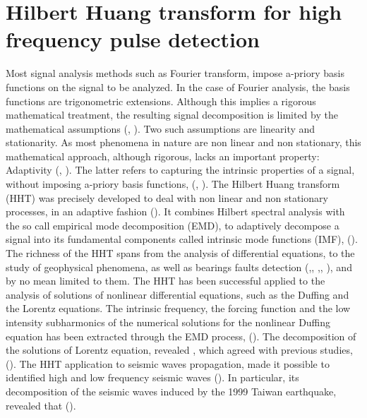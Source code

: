\documentclass[../Main/thesis.tex]{subfiles}
\begin{document}
\chapter[Hilbert Huang transform for high frequency pulse detection]{Hilbert Huang transform for high frequency pulse detection}
\label{sec:hht}

Most signal analysis methods such as Fourier transform, impose a-priory basis functions on the signal to be analyzed. In the case of Fourier analysis, the basis functions are trigonometric extensions. Although this implies a rigorous mathematical treatment, the resulting signal decomposition is limited by the mathematical assumptions (\cite{huang98}, \cite{huang08}). Two such assumptions are linearity and stationarity. As most phenomena in nature are non linear and non stationary, this mathematical approach, although rigorous, lacks an important property: Adaptivity (\cite{huang98}, \cite{huang08}). The latter refers to capturing the intrinsic properties of a signal, without imposing a-priory basis functions, (\cite{huang98}, \cite{huang08}). 
\justify 
The Hilbert Huang transform (HHT) was precisely developed to deal with non linear and non stationary processes, in an adaptive fashion (\cite{huang98}). It combines Hilbert spectral analysis with the so call empirical mode decomposition (EMD), to adaptively decompose a signal into its fundamental components called intrinsic mode functions (IMF), (\cite{huang98}).
The richness of the HHT spans from the analysis of differential equations, to the study of geophysical phenomena, as well as bearings faults detection (\cite{huang08},\cite{li2009}, \cite{yan2006} ,\cite{soualhi2015}, \cite{sallo2019}), and by no mean limited to them.
\justify
 The HHT has been successful applied to the analysis of solutions of nonlinear differential equations, such as the Duffing and the Lorentz equations. The intrinsic frequency, the forcing function and the low intensity subharmonics of the numerical solutions for the nonlinear Duffing equation has been extracted through the EMD process, (\cite{huang98}).
 \justify
  The decomposition of the solutions of Lorentz equation, revealed , which agreed with previous studies, (\cite{huang98}). The HHT application to seismic waves propagation, made it possible to identified high and low frequency seismic waves (\cite{vasudevan2000}). In particular, its decomposition of the seismic waves induced by the 1999 Taiwan earthquake, revealed that  (\cite{huang2001}). 
\end{document}
